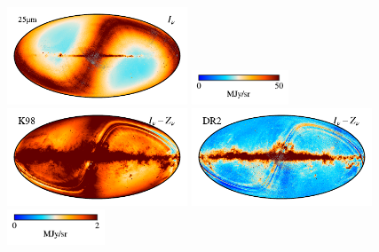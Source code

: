 \documentclass[twocolumn]{aa}
\begin{document}
\begin{figure}
    \includegraphics[height=2.90cm]{figs/compare_zsma/cosmoglobe_ma_06.pdf}%
    \includegraphics[width=2.90cm,angle=90]{figs/compare_zsma/cbar_tot_06.pdf}%
    \includegraphics[height=2.90cm]{figs/compare_zsma/dirbe_zsma_06.pdf}%
    \includegraphics[height=2.90cm]{figs/compare_zsma/cosmoglobe_zsma_06.pdf}%
    \includegraphics[width=2.90cm,angle=90]{figs/compare_zsma/cbar_06.pdf}%
      \\


\end{figure}
\end{document}
